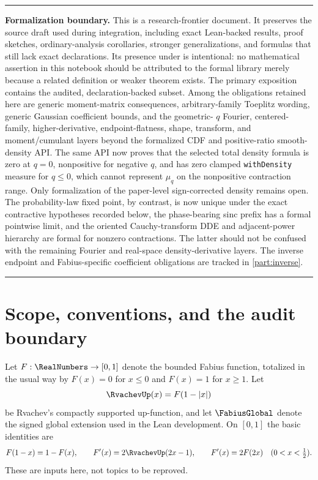 \documentclass[11pt,oneside]{article}
\theoremstyle{definition}
\theoremstyle{remark}
\newenvironment{boxedremark}{%
  \par\smallskip\noindent\begin{center}\begin{minipage}{0.94\textwidth}%
  \color{black}\hrule\vspace{0.6em}\small
}{%
  \vspace{0.6em}\hrule\end{minipage}\end{center}\smallskip
}
\begin{document}
\begin{boxedremark}
\textbf{Formalization boundary.}
This is a research-frontier document.  It preserves the source draft used during integration,
including exact Lean-backed results, proof sketches, ordinary-analysis corollaries, stronger
generalizations, and formulas that still lack exact declarations.  Its presence under
 is intentional: no mathematical assertion in this
notebook should be attributed to the formal library merely because a related definition or
weaker theorem exists.  The primary exposition contains the audited, declaration-backed
subset.  Among the obligations retained here are generic moment-matrix consequences,
arbitrary-family Toeplitz wording, generic Gaussian coefficient bounds, and the geometric-
\(q\) Fourier, centered-family, higher-derivative, endpoint-flatness, shape,
transform, and moment/cumulant layers beyond the formalized CDF and positive-ratio
smooth-density API.  The same API now proves that the selected total density formula is
zero at \(q=0\), nonpositive for negative \(q\), and has zero clamped
\texttt{withDensity} measure for \(q\le0\), which cannot represent \(\mu_q\) on the
nonpositive contraction range.  Only formalization of the paper-level sign-corrected
density remains open.  The
probability-law fixed point, by contrast, is now
unique under the exact contractive hypotheses recorded below, the phase-bearing sinc
prefix has a formal pointwise limit, and the oriented Cauchy-transform DDE and
adjacent-power hierarchy are formal for nonzero contractions.  The latter should not be
confused with the remaining Fourier and real-space density-derivative layers.  The inverse
endpoint and Fabius-specific coefficient obligations are tracked in \cref{part:inverse}.
\end{boxedremark}

\section{Scope, conventions, and the audit boundary}
\label{integration:sec:scope}

Let $F:\RealNumbers\to[0,1]$ denote the bounded Fabius function, totalized in the usual way by
$F(x)=0$ for $x\le0$ and $F(x)=1$ for $x\ge1$.  Let
\begin{equation}
 \RvachevUp(x)=F(1-|x|)
 \label{integration:eq:up-fold-supp}
\end{equation}
be Rvachev's compactly supported up-function, and let $\FabiusGlobal$ denote the signed
global extension used in the Lean development.  On $[0,1]$ the basic identities are
\begin{equation}
 F(1-x)=1-F(x),
 \qquad
 F'(x)=2\RvachevUp(2x-1),
 \qquad
 F'(x)=2F(2x)\quad(0<x<\tfrac12).
 \label{integration:eq:basic-inputs}
\end{equation}
These are inputs here, not topics to be reproved.
\end{document}

